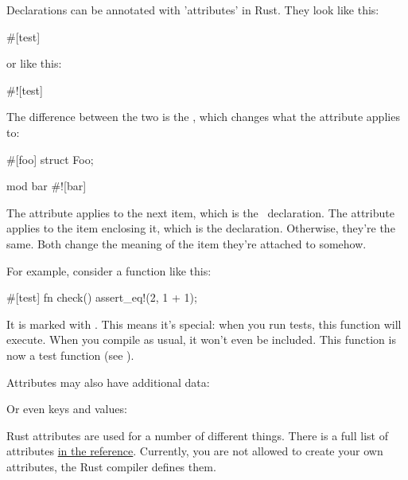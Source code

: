 Declarations can be annotated with 'attributes' in Rust. They look like this:

\begin{rustc}
#[test]
\end{rustc}

or like this:

\begin{rustc}
#![test]
\end{rustc}

The difference between the two is the \code{!}, which changes what the attribute applies to:

\begin{rustc}
#[foo]
struct Foo;

mod bar {
    #![bar]
}
\end{rustc}

The \code{\#[foo]} attribute applies to the next item, which is the \struct\ declaration. The \code{\#![bar]} attribute applies to the 
item enclosing it, which is the  declaration. Otherwise, they're the same. Both change the meaning of the item they're 
attached to somehow.

\blank

For example, consider a function like this:

\begin{rustc}
#[test]
fn check() {
    assert_eq!(2, 1 + 1);
}
\end{rustc}

It is marked with \code{\#[test]}. This means it's special: when you run tests, this function will execute. When you compile as usual, 
it won't even be included. This function is now a test function (see ).

\blank

Attributes may also have additional data:

\begin{rustc}
#[inline(always)]
fn super_fast_fn() {
\end{rustc}

Or even keys and values:

\begin{rustc}
#[cfg(target_os = "macos")]
mod macos_only {
\end{rustc}

Rust attributes are used for a number of different things. There is a full list of attributes 
\href{https://doc.rust-lang.org/reference.html#attributes}{in the reference}. Currently, you are not allowed to create your own 
attributes, the Rust compiler defines them.
